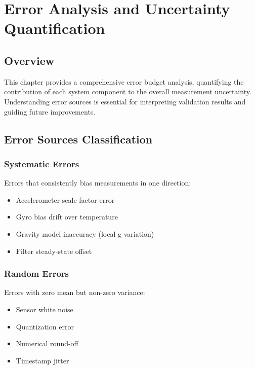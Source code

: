 
\chapter{Error Analysis and Uncertainty Quantification} \label{chap:error_analysis}

\section{Overview}

This chapter provides a comprehensive error budget analysis, quantifying the contribution of each system component to the overall measurement uncertainty. Understanding error sources is essential for interpreting validation results and guiding future improvements.

\section{Error Sources Classification}

\subsection{Systematic Errors}

Errors that consistently bias measurements in one direction:
\begin{itemize}
    \item Accelerometer scale factor error
    \item Gyro bias drift over temperature
    \item Gravity model inaccuracy (local g variation)
    \item Filter steady-state offset
\end{itemize}

\subsection{Random Errors}

Errors with zero mean but non-zero variance:
\begin{itemize}
    \item Sensor white noise
    \item Quantization error
    \item Numerical round-off
    \item Timestamp jitter
\end{itemize}

